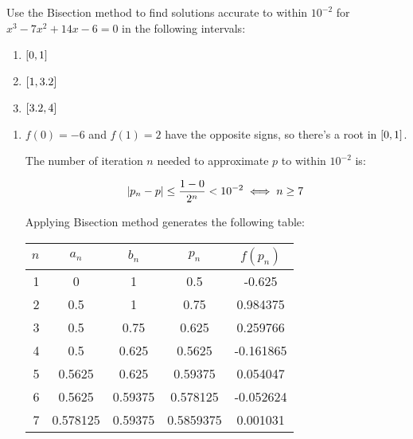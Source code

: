 \documentclass[../../Assignments.tex]{subfiles}
\begin{document}
\begin{exercise}
    Use the Bisection method to find solutions accurate to within \(10^{-2}\)
    for \(x^3 - 7x^2 + 14x - 6 = 0\) in the following intervals:

    \begin{multicols}{3}
        \begin{enumerate}[label = (\alph*)]
            \item \(\interval{0}{1}\)
            \item \(\interval{1}{\num{3.2}}\)
            \item \(\interval{\num{3.2}}{4}\)
        \end{enumerate}
    \end{multicols}
\end{exercise}

\begin{solution}
    \begin{enumerate}[label = (\alph*)]
        \item \(f(0) = -6\) and \(f(1) = 2\) have the opposite signs, so there's
            a root in \(\interval{0}{1}\).

            The number of iteration \(n\) needed to approximate \(p\) to within
            \(10^{-2}\) is:

            \[\abs{p_n - p} \leq \frac{1 - 0}{2^n} < 10^{-2} \iff n \geq 7\]

            Applying Bisection method generates the following table:

            \begin{table}[H]
                \centering
                \begin{tabular}{r S[table-format=1.6] S[table-format=1.5] S[table-format=1.7] S[table-format=-1.6]}
                    \toprule
                    \(n\)  &  {\(a_n\)}  &  {\(b_n\)}  &  {\(p_n\)}  &  {\(f(p_n)\)}  \\
                      &  0          &  1          &  0.5        &  -0.625        \\
                        2  &  0.5        &  1          &  0.75       &   0.984375     \\
                        3  &  0.5        &  0.75       &  0.625      &   0.259766     \\
                        4  &  0.5        &  0.625      &  0.5625     &  -0.161865     \\
                        5  &  0.5625     &  0.625      &  0.59375    &   0.054047     \\
                        6  &  0.5625     &  0.59375    &  0.578125   &  -0.052624     \\
                        7  &  0.578125   &  0.59375    &  0.5859375  &   0.001031     \\
                    \bottomrule
                \end{tabular}
            \end{table}


\end{enumerate}
\end{solution}
\end{document}
